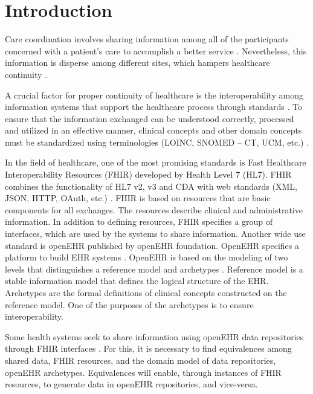 \section{Introduction}

Care coordination involves sharing information among all of the participants concerned with a patient's care to accomplish a better service \cite{CareCoordination}. Nevertheless, this information is disperse among different sites, which hampers healthcare continuity \cite{Indarte11}.

A crucial factor for proper continuity of healthcare is the interoperability among information systems that support the healthcare process through standards \cite{OPS16}. To ensure that the information exchanged can be understood correctly, processed and utilized in an effective manner, clinical concepts and other domain concepts must be standardized using terminologies (LOINC, SNOMED – CT, UCM, etc.) \cite{ISO20514}.

In the field of healthcare, one of the most promising standards is Fast Healthcare Interoperability Resources (FHIR) developed by Health Level 7 (HL7). FHIR combines the functionality of HL7 v2, v3 and CDA with web  standards (XML, JSON, HTTP, OAuth, etc.) \cite{FHIR}. FHIR is based on resources that are basic components for all exchanges. The resources describe clinical and administrative information. In addition to defining resources, FHIR specifies a group of interfaces, which are used by the systems to share information. Another wide use standard is openEHR published by openEHR foundation. OpenEHR specifies a platform to build EHR systems \cite{openEHR}. OpenEHR is based on the modeling of two levels that distinguishes a reference model and archetypes \cite{Bale00}. Reference model is a stable information model that defines the logical structure of the EHR. Archetypes are the formal definitions of clinical concepts constructed on the reference model. One of the purposes of the archetypes is to ensure interoperability.

Some health systems seek to share information using openEHR data repositories through FHIR interfaces \cite{Lopez16}. For this, it is necessary to find equivalences among shared data, FHIR resources, and the domain model of data repositories, openEHR archetypes. Equivalences will enable, through instances of FHIR resources, to generate data in openEHR repositories, and vice-versa.

